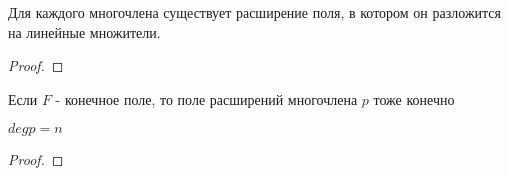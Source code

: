 \documentclass[../main/document.tex]{subfiles}
\begin{document}
\begin{thm}
Для каждого многочлена существует расширение поля, в котором он разложится на линейные множители.
\begin{proof}

\end{proof}
\end{thm}
\begin{cnsq}
Если $F$ - конечное поле, то поле расширений многочлена $p$ тоже конечно
\end{cnsq}
\begin{cnsq}
$deg p =n$
\begin{proof}

\end{proof}
\end{cnsq}
\end{document}
